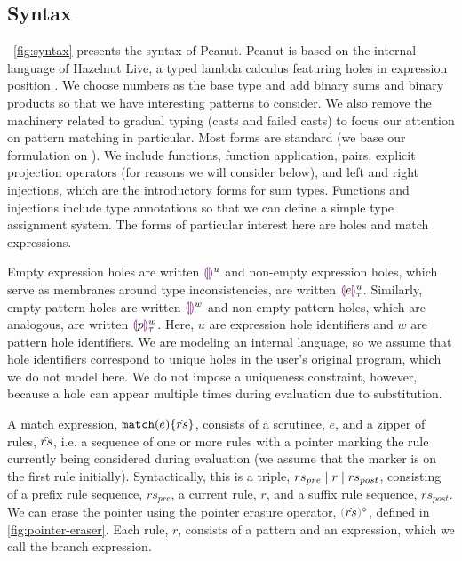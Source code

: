 \subsection{Syntax}
\label{sec:Syntax}
\figurename~\ref{fig:syntax} presents the syntax of Peanut.
Peanut is based on the internal language of Hazelnut Live, a typed lambda calculus featuring holes in expression position \cite{DBLP:journals/pacmpl/OmarVCH19}.
We choose numbers as the base type and add binary sums and binary products so that we have interesting
patterns to consider. We also remove the machinery related to gradual typing (casts and failed casts) to focus our attention on pattern matching in particular. Most forms are standard (we base our formulation on \cite{Harper2012}). We include functions, function application, pairs, explicit projection operators (for reasons we will consider below), and left and right injections, which are the introductory forms for sum types. Functions and injections include type annotations so that we can define a simple type assignment system. The forms of particular interest here are holes and match expressions.

Empty expression holes are written $\textcolor{violet}{\llparenthesis}\textcolor{violet}{\rrparenthesis}^{u}$ and non-empty expression holes, which serve as membranes around type inconsistencies, are written $\textcolor{violet}{\llparenthesis} e\textcolor{violet}{\rrparenthesis}^{u}_{\tau}$. Similarly, empty pattern holes are written $\textcolor{violet}{\llparenthesis}\textcolor{violet}{\rrparenthesis}^{w}$ and non-empty pattern holes, which are analogous, are written $\textcolor{violet}{\llparenthesis} p\textcolor{violet}{\rrparenthesis}^{w}_{\tau}$. Here, $u$ are expression hole identifiers and $w$ are pattern hole identifiers.
We are modeling an internal language, so we assume that hole identifiers 
correspond to unique holes in the user's original program, which we do not model here. We do not impose a uniqueness constraint, however, because a hole can 
appear multiple times during evaluation due to substitution.

A match expression, $\mathtt{match}(e) \{\hat{rs}\}$, 
consists of a scrutinee, $e$, and a zipper of rules, $\hat{rs}$, i.e. a sequence of one or more rules with a pointer marking the rule currently being considered during evaluation (we assume that the marker is on the first rule initially). Syntactically, this is a triple, $rs_{pre} \mid r \mid rs_{post}$, consisting of a prefix rule sequence, $rs_{pre}$, a current rule, $r$, and a suffix rule sequence, $rs_{post}$. We can erase the pointer using the pointer erasure operator, $\rmpointer{\zrules}$, defined in \autoref{fig:pointer-eraser}. 
Each rule, $r$, consists of a pattern and an expression, which we call the branch expression.



